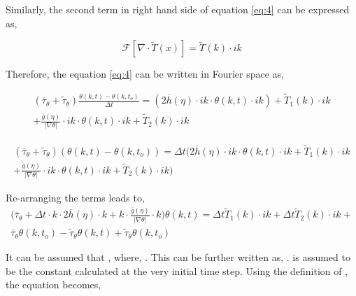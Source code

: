 \documentclass[a4paper,11pt,dvipsnames]{article}
\begin{document}
Similarly, the second term in right hand side of equation \ref{eq:4} can be expressed as, 

\begin{equation}
\mathcal{F} \left [ \nabla \cdot \tilde{T}(x) \right ] = 
\tilde{T}(k) \cdot ik \label{eq:12}
\end{equation}

Therefore, the equation \ref{eq:4} can be written in Fourier space as, 

\begin{multline}
\left ( \overline{\tau}_\theta + \tilde{\tau}_\theta \right ) \frac{\theta (k,t) - \theta (k,t_o)}{\Delta t} = 
\left ( 2 \overline{h} (\eta) \cdot ik \cdot \theta (k,t) \cdot ik \right ) +  \tilde{T}_1 (k) \cdot ik \\ 
+ \frac{\overline{g}(\eta)}{\left | \nabla \theta \right |} \cdot ik \cdot \theta (k,t) \cdot ik + 
\tilde{T}_2 (k) \cdot ik \label{eq:13}
\end{multline}

\begin{multline}
\left ( \overline{\tau}_\theta + \tilde{\tau}_\theta \right ) \left ( \theta (k,t) - \theta (k,t_o) \right ) = 
\Delta t \biggl ( 2 \overline{h} (\eta) \cdot ik \cdot \theta (k,t) \cdot ik +  \tilde{T}_1 (k) \cdot ik \\ 
+ \frac{\overline{g}(\eta)}{\left | \nabla \theta \right |} \cdot ik \cdot \theta (k,t) \cdot ik + 
\tilde{T}_2 (k) \cdot ik \biggr ) \label{eq:14}
\end{multline}

Re-arranging the terms leads to, 
\begin{multline}
\biggl ( \overline{\tau}_\theta + \Delta t \cdot k \cdot 2 \overline{h} (\eta) \cdot k 
+ k \cdot \frac{\overline{g}(\eta)}{\left | \nabla \theta \right |} \cdot k \biggr ) \theta (k,t) = 
\Delta t \tilde{T}_1 (k) \cdot ik + \Delta t \tilde{T}_2 (k) \cdot ik + \\
\overline{\tau}_\theta \theta (k,t_o) - \tilde{\tau}_\theta \theta (k,t) + \tilde{\tau}_\theta \theta (k,t_o) \label{eq:15}
\end{multline}

It can be assumed that , 
where, 
. 
This can be further written as, . 
 is assumed to be the constant 
 calculated at the very initial time step. 
Using the definition of \mathsym{\tau_\theta = \overline{\tau}_\theta + \tilde{\tau}_\theta}, the equation becomes, 
\end{document}
